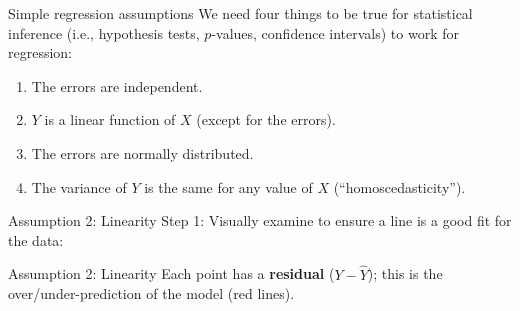 \documentclass{beamer}\usepackage[]{graphicx}\usepackage[]{color}
\makeatletter
\newcommand{\hlnum}[1]{\textcolor[rgb]{0.824,0.412,0.118}{#1}}%
\newcommand{\hlstr}[1]{\textcolor[rgb]{1,0.894,0.71}{#1}}%
\newcommand{\hlopt}[1]{\textcolor[rgb]{1,0.894,0.769}{#1}}%
\newcommand{\hlstd}[1]{\textcolor[rgb]{1,0.894,0.769}{#1}}%
\newcommand{\hlkwb}[1]{\textcolor[rgb]{0.804,0.776,0.451}{#1}}%
\newcommand{\hlkwc}[1]{\textcolor[rgb]{0.78,0.941,0.545}{#1}}%
\newcommand{\hlkwd}[1]{\textcolor[rgb]{1,0.78,0.769}{#1}}%
\newenvironment{kframe}{%
 \def\at@end@of@kframe{}%
 \ifinner\ifhmode%
  \def\at@end@of@kframe{\end{minipage}}%
  \begin{minipage}{\columnwidth}%
 \fi\fi%
 \def\FrameCommand##1{\hskip\@totalleftmargin \hskip-\fboxsep
 \colorbox{shadecolor}{##1}\hskip-\fboxsep
     \hskip-\linewidth \hskip-\@totalleftmargin \hskip\columnwidth}%
 \MakeFramed {\advance\hsize-\width
   \@totalleftmargin\z@ \linewidth\hsize
   \@setminipage}}%
 {\par\unskip\endMakeFramed%
 \at@end@of@kframe}
\newenvironment{knitrout}{}{} %
\makeatother
\begin{document}
\begin{darkframes}
    \begin{frame}{Simple regression assumptions}
      We need four things to be true for statistical inference (i.e., hypothesis tests, $p$-values, confidence intervals) to work for regression:
      \begin{enumerate}
        \item The errors are independent. \greencheckmark
        \item $Y$ is a linear function of $X$ (except for the errors).
        \item The errors are normally distributed.
        \item The variance of $Y$ is the same for any value of $X$ (``homoscedasticity'').
      \end{enumerate}
    \end{frame}

    \begin{frame}{Assumption 2: Linearity}
      Step 1: Visually examine to ensure a line is a good fit for the data:
\begin{knitrout}


\end{knitrout}
    \end{frame}

    \begin{frame}{Assumption 2: Linearity}
      Each point has a \textbf{residual} ($Y-\hat Y$); this is the over/under-prediction of the model (red lines).
\begin{knitrout}


\end{knitrout}
    \end{frame}

\end{darkframes}
\end{document}
